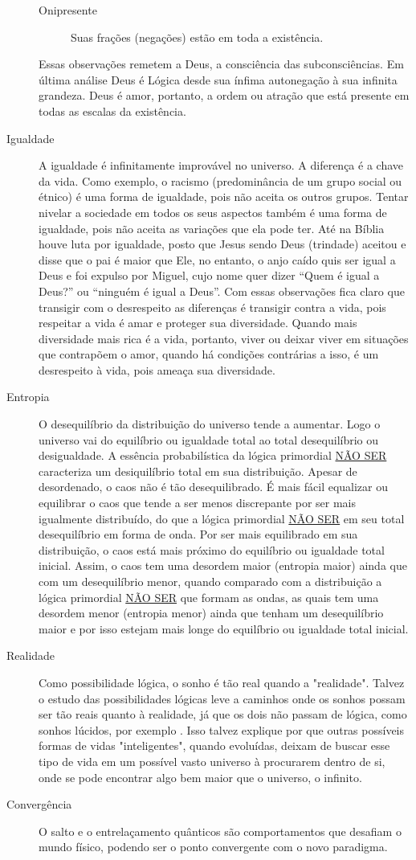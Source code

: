 \begin{description}
\begin{description}
		   \item[Onipresente] Suas frações (negações) estão em toda a existência.
	   \end{description}
	Essas observações remetem a Deus, a consciência das subconsciências. Em última análise Deus é Lógica desde sua ínfima autonegação à sua infinita grandeza. Deus é amor, portanto, a ordem ou atração que está presente em todas as escalas da existência.
	   \item[Igualdade] A igualdade é infinitamente improvável no universo. A diferença é a chave da vida. Como exemplo, o racismo (predominância de um grupo social ou étnico) é uma forma de igualdade, pois não aceita os outros grupos. Tentar nivelar a sociedade em todos os seus aspectos também é uma forma de igualdade, pois não aceita as variações que ela pode ter. Até na Bíblia houve luta por igualdade, posto que Jesus sendo Deus (trindade) aceitou e disse que o pai é maior que Ele, no entanto, o anjo caído quis ser igual a Deus e foi expulso por Miguel, cujo nome quer dizer “Quem é igual a Deus?” ou “ninguém é igual a Deus”. Com essas observações fica claro que transigir com o desrespeito as diferenças é transigir contra a vida, pois respeitar a vida é amar e proteger sua diversidade. Quando mais diversidade mais rica é a vida, portanto, viver ou deixar viver em situações que contrapõem o amor, quando há condições contrárias a isso, é um desrespeito à vida, pois ameaça sua diversidade. 
	   \item[Entropia] O desequilíbrio da distribuição do universo tende a aumentar. Logo o universo vai do equilíbrio ou igualdade total ao total desequilíbrio ou desigualdade. A essência probabilística da lógica primordial \underline{NÃO SER} caracteriza um desiquilíbrio total em sua distribuição. Apesar de desordenado, o caos não é tão desequilibrado. É mais fácil equalizar ou equilibrar o caos que tende a ser menos discrepante por ser mais igualmente distribuído, do que a lógica primordial \underline{NÃO SER} em seu total desequilíbrio em forma de onda. Por ser mais equilibrado em sua distribuição, o caos está mais próximo do equilíbrio ou igualdade total inicial. Assim, o caos tem uma desordem maior (entropia maior) ainda que com um desequilíbrio menor, quando comparado com a distribuição a lógica primordial \underline{NÃO SER} que formam as ondas, as quais tem uma desordem menor (entropia menor) ainda que tenham um desequilíbrio maior e por isso estejam mais longe do equilíbrio ou igualdade total inicial.
	   \item[Realidade] Como possibilidade lógica, o sonho é tão real quando a "realidade". Talvez o estudo das possibilidades lógicas leve a caminhos onde os sonhos possam ser tão reais quanto à realidade, já que os dois não passam de lógica, como sonhos lúcidos, por exemplo \cite{ administradores_principio_pareto}. Isso talvez explique por que outras possíveis formas de vidas "inteligentes", quando evoluídas, deixam de buscar esse tipo de vida em um possível vasto universo à procurarem dentro de si, onde se pode encontrar algo bem maior que o universo, o infinito.
	   \item[Convergência] O salto e o entrelaçamento quânticos são comportamentos que desafiam o mundo físico, podendo ser o ponto convergente com o novo paradigma.
	\end{description}